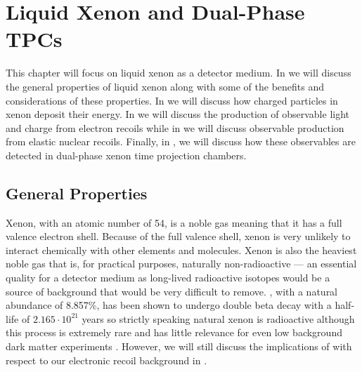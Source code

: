 

\pagestyle{cu}
\graphicspath{{./Chapter2/images/}}

\chapter[Liquid Xenon and Dual-Phase TPCs][Liquid Xenon and Dual-Phase TPCs]{Liquid Xenon and Dual-Phase TPCs}
\label{chap:lxe}

This chapter will focus on liquid xenon as a detector medium.  In  we will discuss the general properties of liquid xenon along with some of the benefits and considerations of these properties.  In  we will discuss how charged particles in xenon deposit their energy.  In  we will discuss the production of observable light and charge from electron recoils while in  we will discuss observable production from elastic nuclear recoils.  Finally, in , we will discuss how these observables are detected in dual-phase xenon time projection chambers.

\section{General Properties}
\label{sec:lxe_chem_properties}

Xenon, with an atomic number of 54, is a noble gas meaning that it has a full valence electron shell.  Because of the full valence shell, xenon is very unlikely to interact chemically with other elements and molecules.  Xenon is also the heaviest noble gas that is, for practical purposes, naturally non-radioactive --- an essential quality for a detector medium as long-lived radioactive isotopes would be a source of background that would be very difficult to remove.  , with a natural abundance of 8.857\%, has been shown to undergo double beta decay with a half-life of $2.165 \cdot 10^{21}$ years so strictly speaking natural xenon is radioactive although this process is extremely rare and has little relevance for even low background dark matter experiments \cite{albert2014improved}.  However, we will still discuss the implications of   with respect to our electronic recoil background in .

